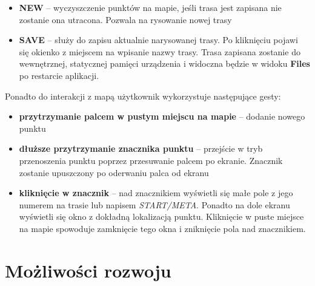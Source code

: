 \begin{itemize}
    \item \textbf{NEW} – wyczyszczenie punktów na mapie, jeśli trasa jest zapisana nie zostanie ona utracona. Pozwala na rysowanie nowej trasy
    \item \textbf{SAVE} – służy do zapisu aktualnie narysowanej trasy. Po kliknięciu pojawi się okienko z miejscem na wpisanie nazwy trasy. Trasa zapisana zostanie do wewnętrznej, statycznej pamięci urządzenia i widoczna będzie w widoku \textbf{Files} po restarcie aplikacji.
\end{itemize}
Ponadto do interakcji z mapą użytkownik wykorzystuje następujące gesty:
\begin{itemize}
    \item \textbf{przytrzymanie palcem w pustym miejscu na mapie} – dodanie nowego punktu
    \item \textbf{dłuższe przytrzymanie znacznika punktu} – przejście w tryb przenoszenia punktu poprzez przesuwanie palcem po ekranie. Znacznik zostanie upuszczony po oderwaniu palca od ekranu
    \item \textbf{kliknięcie w znacznik} – nad znacznikiem wyświetli się małe pole z jego numerem na trasie lub napisem \textit{START/META}. Ponadto na dole ekranu wyświetli się okno z dokładną lokalizacją punktu. Kliknięcie w puste miejsce na mapie spowoduje zamknięcie tego okna i zniknięcie pola nad znacznikiem.
\end{itemize}

\section{Możliwości rozwoju}
